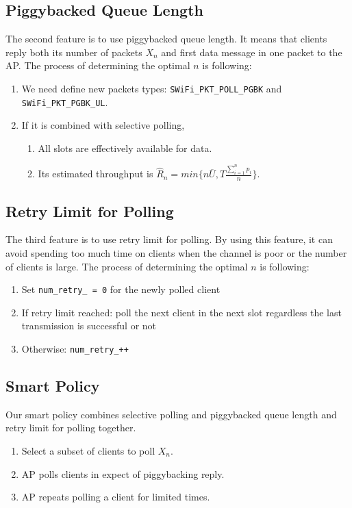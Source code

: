 \documentclass{article}
\begin{document}
\subsection{Piggybacked Queue Length}

The second feature is to use piggybacked queue length. It means that clients reply both its number of packets $X_n$ and first data message in one packet to the AP. The process of determining the optimal $n$ is following:
\begin{enumerate}
\item We need define new packets types: \lstinline|SWiFi_PKT_POLL_PGBK| and \lstinline|SWiFi_PKT_PGBK_UL|. 
\item If it is combined with selective polling,
     \begin{enumerate} 
     \item All slots are effectively available for data.
     \item Its estimated throughput is $\hat{R}_n = min \{ n\overline{U}, T \frac{\sum_{i=1}^{n}p_i}{n} \}$. 
     \end{enumerate}
\end{enumerate}

\subsection{Retry Limit for Polling}

The third feature is to use retry limit for polling. By using this feature, it can avoid spending too much time on clients when the channel is poor or the number of clients is large. The process of determining the optimal $n$ is following:
\begin{enumerate}
\item Set \lstinline|num_retry_ = 0| for the newly polled client
\item If retry limit reached: poll the next client in the next slot regardless the last transmission is successful or not
\item Otherwise: \lstinline|num_retry_++|
\end{enumerate}

\subsection{Smart Policy}
Our smart policy combines selective polling and piggybacked queue length and retry limit for polling together. 
\begin{enumerate}
\item Select a subset of clients to poll $X_n$.
\item AP polls clients in expect of piggybacking reply.
\item AP repeats polling a client for limited times.
\end{enumerate}
\end{document}
